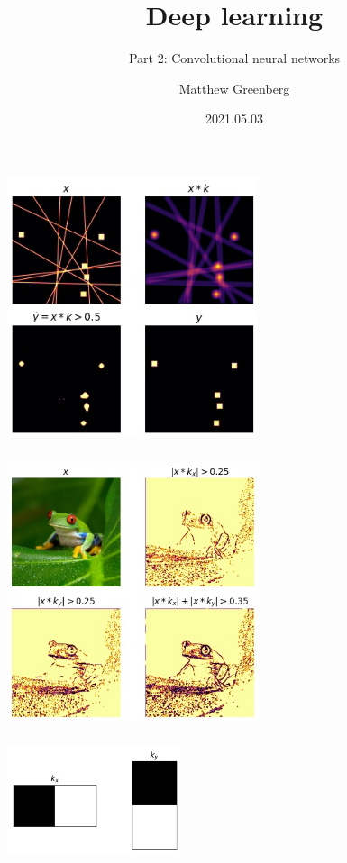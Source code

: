 \documentclass{beamer}
\title{Deep learning}
\subtitle{Part 2: Convolutional neural networks}
\author{Matthew Greenberg}
\date{2021.05.03}
\begin{document}
    \begin{frame}
    \maketitle
    \end{frame}

    


    \begin{frame}
        \frametitle{}
        \includegraphics[height=3in]{filter.jpg}
    \end{frame}

    \begin{frame}
        \frametitle{}
        \includegraphics[height=3in]{filtered-frogs.jpg}
    \end{frame}

    \begin{frame}
        \frametitle{}
        \includegraphics[width=2in]{edge-detectors.jpg}
    \end{frame}
\end{document}
